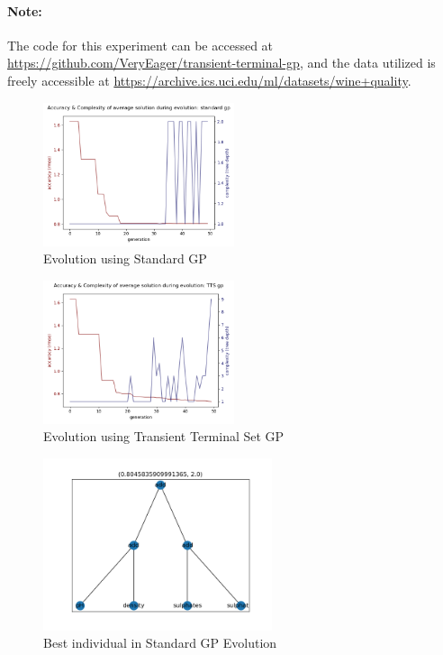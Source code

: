 \documentclass[a4paper]{article}
\begin{document}
\paragraph{Note:} The code for this experiment can be accessed at \url{https://github.com/VeryEager/transient-terminal-gp}, and the data utilized is freely accessible at \url{https://archive.ics.uci.edu/ml/datasets/wine+quality}.
\begin{figure}[H]
	\caption{Evolution using Standard GP}
	\centering
	\includegraphics[width=0.5\textwidth]{Figure_1}
\end{figure}
\begin{figure}[H]
	\caption{Evolution using Transient Terminal Set GP}
	\centering
	\includegraphics[width=0.5\textwidth]{Figure_3}
\end{figure}
\begin{figure}[H]
	\caption{Best individual in Standard GP Evolution}
	\centering
	\includegraphics[width=0.6\textwidth]{Figure_2}
\end{figure}
\end{document}
